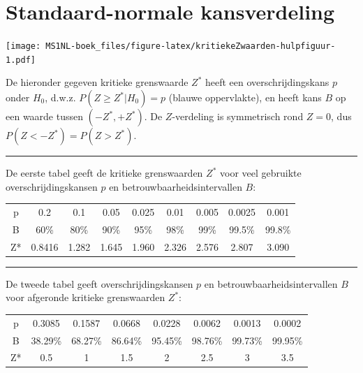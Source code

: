 \documentclass[
]{book}
\begin{document}
\hypertarget{app:kritiekeZwaarden}{%
\chapter{Standaard-normale kansverdeling}\label{app:kritiekeZwaarden}}

\texttt{[image: MS1NL-boek\_files/figure-latex/kritiekeZwaarden-hulpfiguur-1.pdf]}

De hieronder gegeven kritieke grenswaarde \(Z^*\) heeft een overschrijdingskans \(p\) onder \(H_0\),
d.w.z. \(P(Z \geq Z^*|H_0)=p\) (blauwe oppervlakte),
en heeft kans \(B\) op een waarde tussen \((-Z^*, +Z^*)\).
De \(Z\)-verdeling is symmetrisch rond \(Z=0\), dus \(P(Z < -Z^*) = P(Z > Z^*)\).

\begin{center}\rule{0.5\linewidth}{0.5pt}\end{center}

De eerste tabel geeft de kritieke grenswaarden \(Z^*\) voor veel gebruikte overschrijdingskansen \(p\) en betrouwbaarheidsintervallen \(B\):

\begin{tabular}{ccccccccc}
\toprule
 &  &  &  &  &  &  &  & \\
\midrule
p & 0.2 & 0.1 & 0.05 & 0.025 & 0.01 & 0.005 & 0.0025 & 0.001\\
B & 60\% & 80\% & 90\% & 95\% & 98\% & 99\% & 99.5\% & 99.8\%\\
Z* & 0.8416 & 1.282 & 1.645 & 1.960 & 2.326 & 2.576 & 2.807 & 3.090\\
\bottomrule
\end{tabular}

\begin{center}\rule{0.5\linewidth}{0.5pt}\end{center}

De tweede tabel geeft overschrijdingskansen \(p\) en betrouwbaarheidsintervallen \(B\) voor afgeronde kritieke grenswaarden \(Z^*\):

\begin{tabular}{cccccccc}
\toprule
 &  &  &  &  &  &  & \\
\midrule
p & 0.3085 & 0.1587 & 0.0668 & 0.0228 & 0.0062 & 0.0013 & 0.0002\\
B & 38.29\% & 68.27\% & 86.64\% & 95.45\% & 98.76\% & 99.73\% & 99.95\%\\
Z* & 0.5 & 1 & 1.5 & 2 & 2.5 & 3 & 3.5\\
\bottomrule
\end{tabular}
\end{document}

